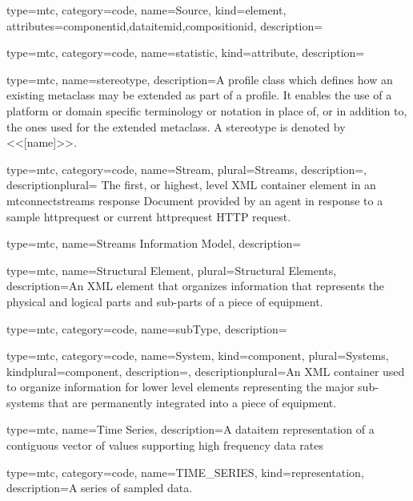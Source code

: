 {
  type=mtc,
  category=code,
  name={Source},
  kind={element},
  attributes={\gls{componentid},\gls{dataitemid},\gls{compositionid}},
  description={}
}


{
  type=mtc,
  category=code,
  name={statistic},
  kind={attribute},
  description={}
}


{
  type=mtc,
  name=stereotype,
  description={A profile class which defines how an existing metaclass may be extended as part of a profile. It enables the use of a platform or domain specific terminology or notation in place of, or in addition to, the ones used for the extended metaclass. A stereotype is denoted by <<[name]>>.}
}


{
  type=mtc,
  category=code,
  name={Stream},
  plural={Streams},
  description={},
  descriptionplural= {The first, or highest, level XML container element in an \glspl{mtconnectstream} \gls{response} Document provided by an \gls{agent} in response to a \gls{sample httprequest} or \gls{current httprequest} HTTP \gls{request}.}
}


{
  type=mtc,
  name={Streams Information Model},
  description={}
}


{
  type=mtc,
  name={Structural Element},
  plural={Structural Elements},
  description={An XML element that organizes information that represents the physical and logical parts and sub-parts of a piece of equipment.}
}


{
  type=mtc,
  category=code,
  name={subType},
  description={}
}


{
  type=mtc,
  category=code,
  name={System},
  kind={component},
  plural={Systems},
  kindplural={component},
  description={},
  descriptionplural={An XML container used to organize information for \gls{lower level} elements representing the major sub-systems that are permanently integrated into a piece of equipment.}
}


{
  type=mtc,
  name={Time Series},
  description={A \gls{dataitem} representation of a contiguous vector of values supporting high frequency data rates}
}


{
  type=mtc,
  category=code,
  name={TIME\_SERIES},
  kind={representation},
  description={A series of sampled data. }
}


